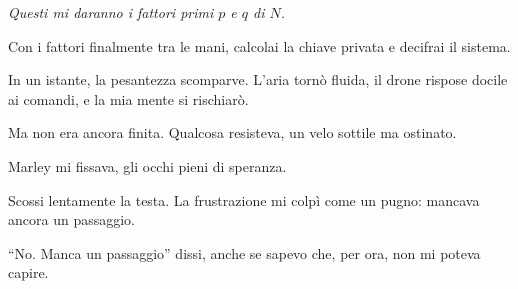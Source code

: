\emph{Questi mi daranno i fattori primi \( p \) e \( q \) di \( N \).}


Con i fattori finalmente tra le mani, calcolai la chiave privata e decifrai il sistema.

In un istante, la pesantezza scomparve. L'aria tornò fluida, il drone rispose docile ai comandi, e la mia mente si rischiarò.

Ma non era ancora finita. Qualcosa resisteva, un velo sottile ma ostinato.

Marley mi fissava, gli occhi pieni di speranza.

Scossi lentamente la testa. La frustrazione mi colpì come un pugno: mancava ancora un passaggio.


\begin{dialogue}
 \enquote{No. Manca un passaggio} dissi, anche se sapevo che, per ora, non mi poteva capire. 
\end{dialogue}


